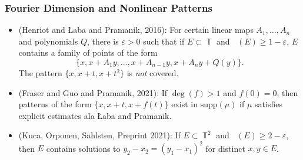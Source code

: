 \documentclass[usenames,dvipsnames]{beamer}
\DeclareMathOperator{\TT}{\mathbb{T}}
\DeclareMathOperator{\fordim}{\text{dim}_{\mathbb{F}}}
\DeclareMathOperator{\hausdim}{\text{dim}_{\mathbb{H}}}
\begin{document}
\begin{frame}
    \frametitle{Fourier Dimension and Nonlinear Patterns}

    \begin{itemize}
        \pause
        \item (Henriot and Łaba and Pramanik, 2016): For certain linear maps $A_1,\dots,A_n$ and polynomials $Q$, there is $\varepsilon > 0$ such that if $E \subset \TT$ and $\fordim(E) \geq 1 - \varepsilon$, $E$ contains a family of points of the form
        \[ \{ x, x + A_1y, \dots, x + A_{n-1}y, x + A_ny + Q(y) \}. \]
        The pattern $\{ x, x + t, x + t^2 \}$ is \emph{not} covered.

        \pause
        \item (Fraser and Guo and Pramanik, 2021): If $\deg(f) > 1$ and $f(0) = 0$, then patterns of the form $\{ x, x + t, x + f(t) \}$ exist in $\text{supp}(\mu)$ if $\mu$ satisfies explicit estimates ala Łaba and Pramanik.

        \pause
        \item (Kuca, Orponen, Sahlsten, Preprint 2021): If $E \subset \TT^2$ and $\hausdim(E) \geq 2 - \varepsilon$, then $E$ contains solutions to $y_2 - x_2 = (y_1 - x_1)^2$ for distinct $x,y \in E$.
    \end{itemize}
\end{frame}
\end{document}
